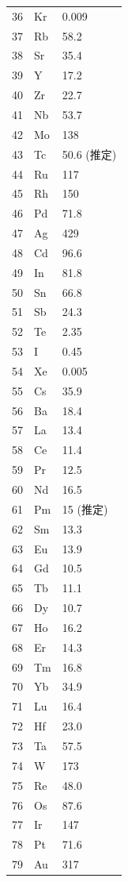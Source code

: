\documentclass[11pt,a4paper]{article}
\theoremstyle{remark}
\begin{document}
\begin{longtable}{p{0.6cm}p{1.2cm}p{1.5cm}}
		36 & Kr & 0.009 \\
		37 & Rb & 58.2 \\
		38 & Sr & 35.4 \\
		39 & Y  & 17.2 \\
		40 & Zr & 22.7 \\
		41 & Nb & 53.7 \\
		42 & Mo & 138 \\
		43 & Tc & 50.6 (推定) \\
		44 & Ru & 117 \\
		45 & Rh & 150 \\
		46 & Pd & 71.8 \\
		47 & Ag & 429 \\
		48 & Cd & 96.6 \\
		49 & In & 81.8 \\
		50 & Sn & 66.8 \\
		51 & Sb & 24.3 \\
		52 & Te & 2.35 \\
		53 & I  & 0.45 \\
		54 & Xe & 0.005 \\
		55 & Cs & 35.9 \\
		56 & Ba & 18.4 \\
		57 & La & 13.4 \\
		58 & Ce & 11.4 \\
		59 & Pr & 12.5 \\
		60 & Nd & 16.5 \\
		61 & Pm & 15 (推定) \\
		62 & Sm & 13.3 \\
		63 & Eu & 13.9 \\
		64 & Gd & 10.5 \\
		65 & Tb & 11.1 \\
		66 & Dy & 10.7 \\
		67 & Ho & 16.2 \\
		68 & Er & 14.3 \\
		69 & Tm & 16.8 \\
		70 & Yb & 34.9 \\
		71 & Lu & 16.4 \\
		72 & Hf & 23.0 \\
		73 & Ta & 57.5 \\
		74 & W  & 173 \\
		75 & Re & 48.0 \\
		76 & Os & 87.6 \\
		77 & Ir & 147 \\
		78 & Pt & 71.6 \\
		79 & Au & 317 \\

\end{longtable}
\end{document}
